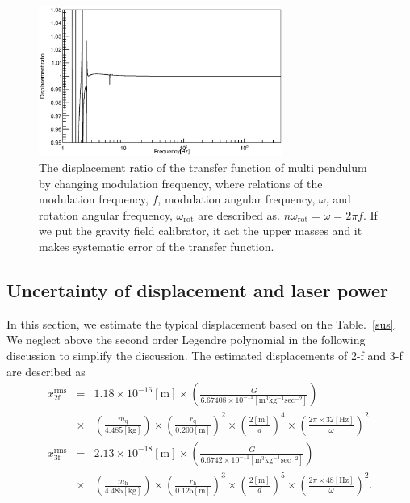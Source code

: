 \documentclass[%
 reprint,
superscriptaddress,
 amsmath,amssymb,
 aps,
]{revtex4-1}
\begin{document}
\begin{figure}
\begin{center}
\includegraphics[width=8cm]{dx_Gcal_ratio.eps}
\caption{The displacement ratio of the transfer function of multi pendulum by changing modulation frequency, where relations of the modulation frequency, $f$, modulation angular frequency, $\omega$, and rotation angular frequency, $\omega_{\mathrm{rot}}$ are described as. $n\omega_{\mathrm{rot}}=\omega=2\pi f$. If we put the gravity field calibrator, it act the upper masses and it makes systematic error of the transfer function.}
\label{fig:ratio}
\end{center}
\end{figure}

\subsection{Uncertainty of displacement and  laser power}
In this section, we estimate the typical displacement based on the Table.~\ref{sus}. We neglect above the second order Legendre polynomial in the following discussion to simplify the discussion. 
 The estimated displacements of 2-f and 3-f are described as
 \footnotesize
\begin{eqnarray}
x^{\mathrm{rms}}_{\mathrm{2f}}&=&1.18 \times 10^{-16}\mathrm{[m]} \times \left( \frac{G}{6.67408 \times 10^{-11} \mathrm{[m^3kg^{-1}sec^{-2}]}} \right) \nonumber \\
&\times&\! \left( \! \frac{m_{\mathrm{q}}}{4.485 \mathrm{[kg]}} \!\right) \! \times \!\left( \!\frac{r_{\mathrm{q}}}{0.200 \mathrm{[m]}} \! \right)^2 \! \times \! \left( \! \frac{2\mathrm{[m]}}{d} \! \right)^4 \! \times \! \left( \! \frac{2\pi \! \times \! 32\mathrm{[Hz]}}{\omega} \! \right)^2\\
x^{\mathrm{rms}}_{\mathrm{3f}}&=&2.13 \times 10^{-18}\mathrm{[m]} \times \left( \frac{G}{6.6742 \times 10^{-11} \mathrm{[m^3kg^{-1}sec^{-2}]}} \right) \nonumber \\
&\times& \! \left( \! \frac{m_{\mathrm{h}}}{4.485 \mathrm{[kg]}}\! \right) \! \times \! \left(  \!\frac{r_{\mathrm{h}}}{0.125 \mathrm{[m]}} \! \right)^3 
\! \times \! \left(\! \frac{2\mathrm{[m]}}{d} \! \right)^5 \! \times \! \left( \! \frac{2\pi\!\times \! 48\mathrm{[Hz]}}{\omega} \! \right)^2.
\end{eqnarray}
\normalsize
\end{document}

